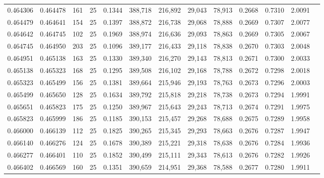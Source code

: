 \begin{tabular}{rrrrrrrrrrrrr}
0.464306 & 0.464478 &   161 &  25 &                                     0.1344 & 388,718 & 216,892 &  29,043 &  78,913 & 0.2668 & 0.7310 & 2.0091 \\
0.464479 & 0.464641 &   154 &  25 &                                     0.1397 & 388,872 & 216,738 &  29,068 &  78,888 & 0.2669 & 0.7307 & 2.0077 \\
0.464642 & 0.464745 &   102 &  25 &                                     0.1969 & 388,974 & 216,636 &  29,093 &  78,863 & 0.2669 & 0.7305 & 2.0067 \\
0.464745 & 0.464950 &   203 &  25 &                                     0.1096 & 389,177 & 216,433 &  29,118 &  78,838 & 0.2670 & 0.7303 & 2.0048 \\
0.464951 & 0.465138 &   163 &  25 &                                     0.1330 & 389,340 & 216,270 &  29,143 &  78,813 & 0.2671 & 0.7300 & 2.0033 \\
0.465138 & 0.465323 &   168 &  25 &                                     0.1295 & 389,508 & 216,102 &  29,168 &  78,788 & 0.2672 & 0.7298 & 2.0018 \\
0.465323 & 0.465499 &   156 &  25 &                                     0.1381 & 389,664 & 215,946 &  29,193 &  78,763 & 0.2673 & 0.7296 & 2.0003 \\
0.465499 & 0.465650 &   128 &  25 &                                     0.1634 & 389,792 & 215,818 &  29,218 &  78,738 & 0.2673 & 0.7294 & 1.9991 \\
0.465651 & 0.465823 &   175 &  25 &                                     0.1250 & 389,967 & 215,643 &  29,243 &  78,713 & 0.2674 & 0.7291 & 1.9975 \\
0.465823 & 0.465999 &   186 &  25 &                                     0.1185 & 390,153 & 215,457 &  29,268 &  78,688 & 0.2675 & 0.7289 & 1.9958 \\
0.466000 & 0.466139 &   112 &  25 &                                     0.1825 & 390,265 & 215,345 &  29,293 &  78,663 & 0.2676 & 0.7287 & 1.9947 \\
0.466140 & 0.466276 &   124 &  25 &                                     0.1678 & 390,389 & 215,221 &  29,318 &  78,638 & 0.2676 & 0.7284 & 1.9936 \\
0.466277 & 0.466401 &   110 &  25 &                                     0.1852 & 390,499 & 215,111 &  29,343 &  78,613 & 0.2676 & 0.7282 & 1.9926 \\
0.466402 & 0.466569 &   160 &  25 &                                     0.1351 & 390,659 & 214,951 &  29,368 &  78,588 & 0.2677 & 0.7280 & 1.9911 \\

\end{tabular}
